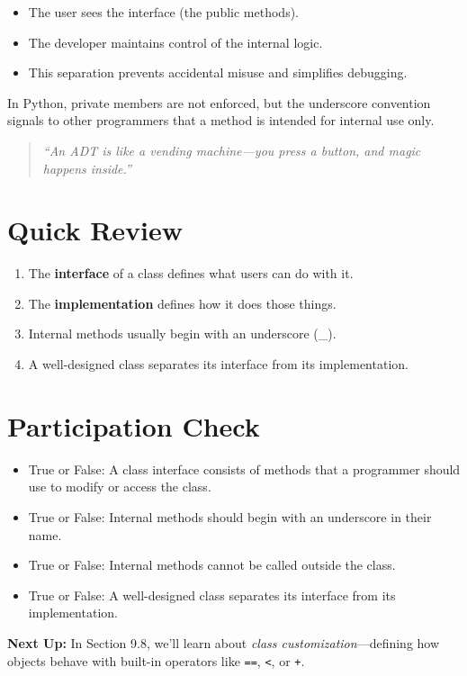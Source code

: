\begin{itemize}
    \item The user sees the interface (the public methods).
    \item The developer maintains control of the internal logic.
    \item This separation prevents accidental misuse and simplifies debugging.
\end{itemize}

\vspace{1em}
\noindent
In Python, private members are not enforced, but the underscore convention signals to other programmers that a method is intended for internal use only.

\begin{quote}
\textit{“An ADT is like a vending machine—you press a button, and magic happens inside.”}
\end{quote}

\section{Quick Review}
\begin{enumerate}
    \item The \textbf{interface} of a class defines what users can do with it.
    \item The \textbf{implementation} defines how it does those things.
    \item Internal methods usually begin with an underscore (\_).
    \item A well-designed class separates its interface from its implementation.
\end{enumerate}

\section*{Participation Check}
\begin{itemize}
    \item True or False: A class interface consists of methods that a programmer should use to modify or access the class.
    \item True or False: Internal methods should begin with an underscore in their name.
    \item True or False: Internal methods cannot be called outside the class.
    \item True or False: A well-designed class separates its interface from its implementation.
\end{itemize}

\vspace{2em}
\noindent
\textbf{Next Up:} In Section 9.8, we’ll learn about \textit{class customization}—defining how objects behave with built-in operators like \texttt{==}, \texttt{<}, or \texttt{+}.

